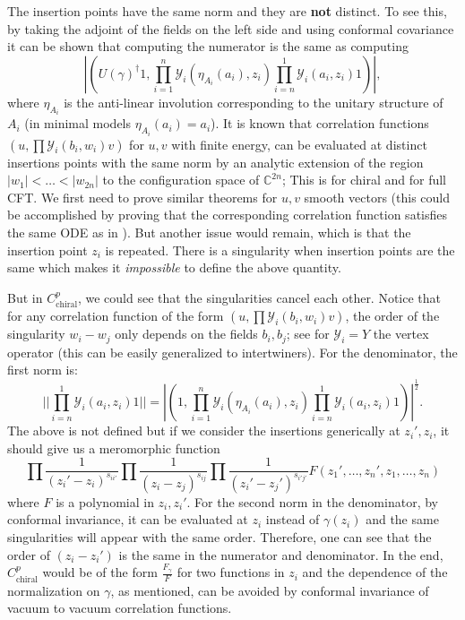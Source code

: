 \documentclass[twoside,11pt,titlepage]{amsart}
\renewcommand{\=}[1]{\stackrel{#1}{=}} %
\theoremstyle{definition}
\theoremstyle{remark}
\begin{document}
The insertion points have the same norm and they are \textbf{not} distinct. To see this, by taking the adjoint of the fields on the left side and using conformal covariance it can be shown that computing the numerator is the same as computing
$$|(U(\gamma)^\dagger1,\prod_{i=1}^n \mathscr{Y}_i(\eta_{A_i}(a_i),z_i)\prod_{i=n}^1\mathscr{Y}_i(a_i,z_i)1)|,$$
where $\eta_{A_i}$ is the anti-linear involution corresponding to the unitary structure of $A_i$ (in minimal models $\eta_{A_i}(a_i)=a_i$). It is known that correlation functions $(u,\prod \mathscr{Y}_i(b_i,w_i)v)$ for $u,v$ with finite energy, can be evaluated at distinct insertions points with the same norm by an analytic extension of the region $|w_1|<\ldots<|w_{2n}|$ to the configuration space of $\mathbb{C}^{2n}$; This is \cite[Theorem 3.5]{huang2005adifferential} for chiral and \cite[Proposition 2.8]{huang2005bdifferential} for full CFT. We first need to prove similar theorems for $u,v$ smooth vectors (this could be accomplished by proving that the corresponding correlation function satisfies the same ODE as in \cite[Theorem 1.6]{huang2005adifferential}). But another issue would remain, which is that the insertion point $z_i$ is repeated. There is a singularity when insertion points are the same which makes it \textit{impossible} to define the above quantity. 

But in $C_{\text{chiral}}^p$, we could see that the singularities cancel each other. Notice that for any correlation function of the form $(u,\prod \mathscr{Y}_i(b_i,w_i)v)$, the order of the singularity $w_i-w_j$ only depends on the fields $b_i,b_j$; see \cite[Proposition 3.5.1]{frenkel1993axiomatic} for $\mathscr{Y}_i=Y$ the vertex operator (this can be easily generalized to intertwiners). For the denominator, the first norm is: 
$$||\prod_{i=n}^1\mathscr{Y}_i(a_i,z_i)1||=|(1,\prod_{i=1}^n\mathscr{Y}_i(\eta_{A_i}(a_i),z_i)\prod_{i=n}^1\mathscr{Y}_i(a_i,z_i)1)|^{\frac{1}{2}}.$$
The above is not defined but if we consider the insertions generically at $z_i',z_i$, it should give us a meromorphic function 
$$\prod \frac{1}{(z_i'-z_i)^{s_{ii'}}}\prod \frac{1}{(z_i-z_j)^{s_{ij}}}\prod \frac{1}{(z_i'-z_j')^{s_{i'j'}}}F(z_1',\ldots,z_n',z_1,\ldots,z_n)$$ 
where $F$ is a polynomial in $z_i,z_i'$. For the second norm in the denominator, by conformal invariance, it can be evaluated at $z_i$ instead of $\gamma(z_i)$ and the same singularities will appear with the same order. Therefore, one can see that the order of $(z_i-z_i')$ is the same in the numerator and denominator. In the end,  $C_{\text{chiral}}^p$ would be of the form $\frac{F_\gamma}{F}$ for two functions in $z_i$ and the dependence of the normalization on $\gamma$, as mentioned, can be avoided by conformal invariance of vacuum to vacuum correlation functions.
\end{document}
